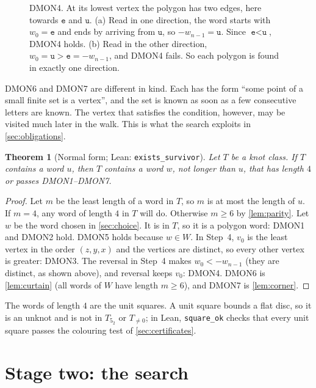 \documentclass[11pt]{article}
\theoremstyle{plain}
\newtheorem{theorem}{Theorem}[section]
\theoremstyle{definition}
\theoremstyle{remark}
\newcommand{\word}[1]{\texttt{#1}}
\newcommand{\lean}[1]{\texttt{#1}}
\newcommand{\dmon}[1]{\textup{DMON#1}}
\begin{document}
\begin{figure}[t]
\centering
\FigOrigin
\caption{\dmon4. At its lowest vertex the polygon has two edges, here towards $\word{e}$ and
$\word{u}$. (a) Read in one direction, the word starts with $w_0=\word{e}$ and ends by arriving from
$\word{u}$, so $-w_{n-1}=\word{u}$. Since $\word{e}<\word{u}$, \dmon4 holds. (b) Read in the other
direction, $w_0=\word{u}>\word{e}=-w_{n-1}$, and \dmon4 fails. So each polygon is found in exactly one
direction.}
\label{fig:origin}
\end{figure}

\dmon6 and \dmon7 are different in kind. Each has the form ``some point of a small finite set is a
vertex'', and the set is known as soon as a few consecutive letters are known. The vertex that
satisfies the condition, however, may be visited much later in the walk. This is what the search
exploits in \cref{sec:obligations}.

\begin{theorem}[Normal form; Lean: \lean{exists\_survivor}]\label{thm:normal}
Let $T$ be a knot class. If $T$ contains a word $u$, then $T$
contains a word $w$, not longer than $u$, that has length $4$ or passes \dmon1--\dmon7.
\end{theorem}
\begin{proof}
Let $m$ be the least length of a word in $T$, so $m$ is at most the length of $u$. If $m=4$, any word of length $4$ in $T$
will do. Otherwise $m\ge6$ by \cref{lem:parity}. Let $w$ be the word chosen in \cref{sec:choice}. It is
in $T$, so it is a polygon word: \dmon1 and \dmon2 hold. \dmon5 holds because $w\in W$. In Step~4,
$v_0$ is the least vertex in the order $(z,y,x)$ and the vertices are distinct, so every other vertex is
greater: \dmon3. The reversal in Step~4 makes $w_0<-w_{n-1}$ (they are distinct, as shown above), and
reversal keeps $v_0$: \dmon4. \dmon6 is \cref{lem:curtain} (all words of $W$ have length $m\ge6$), and
\dmon7 is \cref{lem:corner}.
\end{proof}

The words of length $4$ are the unit squares. A unit square bounds a flat disc, so it is an unknot and
is not in $T_{5_2}$ or $T_{\ne0}$; in Lean, \lean{square\_ok} checks that every unit square passes the
colouring test of \cref{sec:certificates}.

\section{Stage two: the search}\label{sec:search}
\end{document}
